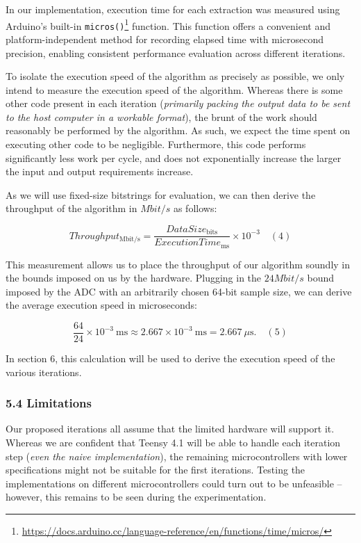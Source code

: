 \documentclass{sigchi}
\begin{document}
In our implementation, execution time for each extraction was measured using Arduino's built-in \texttt{micros()}\footnote{\url{https://docs.arduino.cc/language-reference/en/functions/time/micros/}} function. This function offers a convenient and platform-independent method for recording elapsed time with microsecond precision, enabling consistent performance evaluation across different iterations.

To isolate the execution speed of the algorithm as precisely as possible, we only intend to measure the execution speed of the algorithm. Whereas there is some other code present in each iteration (\emph{primarily packing the output data to be sent to the host computer in a workable format}), the brunt of the work should reasonably be performed by the algorithm. As such, we expect the time spent on executing other code to be negligible. Furthermore, this code performs significantly less work per cycle, and does not exponentially increase the larger the input and output requirements increase.

As we will use fixed-size bitstrings for evaluation, we can then derive the throughput of the algorithm in \(Mbit/s\) as follows:

\[
Throughput_\mathrm{Mbit/s}
= \frac{DataSize_\mathrm{bits}}{ExecutionTime_\mathrm{ms}}
\times 10^{-3}
\phantom{12}(4)
\]

This measurement allows us to place the throughput of our algorithm soundly in the bounds imposed on us by the hardware. Plugging in the \(24 Mbit/s\) bound imposed by the ADC with an arbitrarily chosen 64-bit sample size, we can derive the average execution speed in microseconds:

\[
\frac{64}{24}\times10^{-3}\ \mathrm{ms}
\approx 2.667\times10^{-3}\ \mathrm{ms}
=2.667\ \mu\mathrm{s}.
\phantom{12}(5)
\]

In section 6, this calculation will be used to derive the execution speed of the various iterations.

\subsubsection{5.4 Limitations}\label{limitations}

Our proposed iterations all assume that the limited hardware will support it. Whereas we are confident that Teensy 4.1 will be able to handle each iteration step (\emph{even the naive implementation}), the remaining microcontrollers with lower specifications might not be suitable for the first iterations. Testing the implementations on different microcontrollers could turn out to be unfeasible -- however, this remains to be seen during the experimentation.
\end{document}
